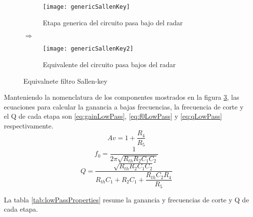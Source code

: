 \begin{figure}
  \centering
  \begin{subfigure}{0.4\textwidth}
    \texttt{[image: genericSallenKey]}
    \caption{Etapa generica del circuito pasa bajo del radar}
    \label{fig:genericSallen}   
  \end{subfigure}
  {\color{blue}\LARGE$\Rightarrow$}
  \begin{subfigure}{0.4\textwidth}
    \texttt{[image: genericSallenKey2]}
    \caption{Equivalente del circuito pasa bajos del radar}
    \label{fig:genericSallen2}
  \end{subfigure}             
  \caption{Equivalnete filtro Sallen-key}
\end{figure}
Manteniendo la nomenclatura de los componentes mostrados en la figura \ref{fig:genericSallen2}, las ecuaciones para calcular la ganancia a bajas frecuencias, la frecuencia de corte y el Q de cada etapa son \ref{eq:gainLowPass}, \ref{eq:f0LowPass} y \ref{eq:qLowPass} respectivamente.
\begin{equation}\label{eq:gainLowPass}
  Av = 1 + \dfrac{R_4}{R_5}
\end{equation}
\begin{equation}\label{eq:f0LowPass}
  f_0 = \dfrac{1}{2\pi\sqrt{R_{th}R_2C_1C_2}}
\end{equation}
\begin{equation}\label{eq:qLowPass}
  Q = \dfrac{\sqrt{R_{th}R_2C_1C_2}}{R_{th}C_1 + R_2C_1 + \dfrac{R_{th}C_2R_4}{R_5}}
\end{equation}

La tabla \ref{tab:lowPassProperties} resume la ganancia y frecuencias de corte y Q de cada etapa.


